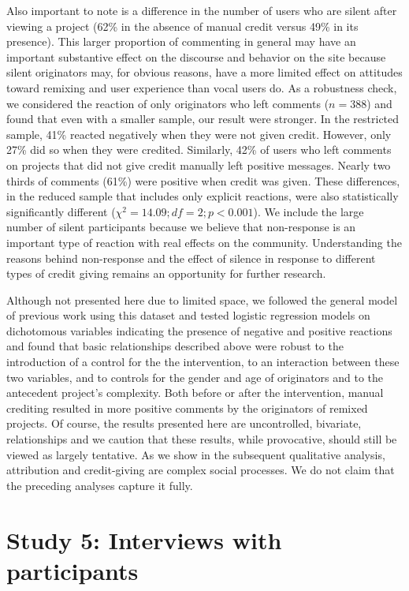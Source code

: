 Also important to note is a difference in the number of users who are
silent after viewing a project (62\% in the absence of manual credit
versus 49\% in its presence). This larger proportion of commenting in
general may have an important substantive effect on the discourse and
behavior on the site because silent originators may, for obvious
reasons, have a more limited effect on attitudes toward remixing and
user experience than vocal users do. As a robustness check, we
considered the reaction of only originators who left comments
($n=388$) and found that even with a smaller sample, our result were
stronger. In the restricted sample, 41\% reacted negatively when they
were not given credit.  However, only 27\% did so when they were
credited. Similarly, 42\% of users who left comments on projects that
did not give credit manually left positive messages. Nearly two thirds
of comments (61\%) were positive when credit was given.  These
differences, in the reduced sample that includes only explicit
reactions, were also statistically significantly different ($\chi^2 =
14.09; df=2; p<0.001$). We include the large number of silent
participants because we believe that non-response is an important type
of reaction with real effects on the community. Understanding the
reasons behind non-response and the effect of silence in response to
different types of credit giving remains an opportunity for further
research.

Although not presented here due to limited space, we followed the
general model of previous work using this dataset
\cite{hill_responses_2010} and tested logistic regression models on
dichotomous variables indicating the presence of negative and positive
reactions and found that basic relationships described above were
robust to the introduction of a control for the the intervention, to
an interaction between these two variables, and to controls for the
gender and age of originators and to the antecedent project's
complexity. Both before or after the intervention, manual crediting
resulted in more positive comments by the originators of remixed
projects. Of course, the results presented here are uncontrolled,
bivariate, relationships and we caution that these results, while
provocative, should still be viewed as largely tentative. As we show
in the subsequent qualitative analysis, attribution and credit-giving
are complex social processes. We do not claim that the preceding
analyses capture it fully.


\section{Study 5: Interviews with participants}

